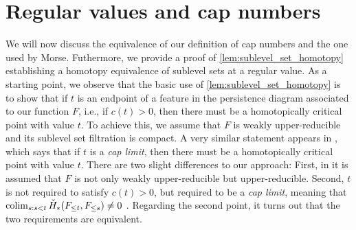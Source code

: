 
\section{Regular values and cap numbers} \label{s:caps}
We will now discuss the equivalence of our definition of cap numbers and the one used by Morse.
Futhermore, we provide a proof of \cref{lem:sublevel_set_homotopy} establishing a homotopy equivalence of sublevel sets at a regular value.
As a starting point, we observe that the basic use of \cref{lem:sublevel_set_homotopy} is to show that if $t$ is an endpoint of a feature in the persistence diagram associated to our function $F$, i.e., if $c(t) > 0$, then there must be a homotopically critical point with value $t$.
To achieve this, we assume that $F$ is weakly upper-reducible and its sublevel set filtration is compact.
A very similar statement appears in \cite[Theorem 8.1]{Morse.1938}, which says that if $t$ is a \emph{cap limit}, then there must be a homotopically critical point with value $t$.
There are two slight differences to our approach:
First, in \cite[Theorem 8.1]{Morse.1938} it is assumed that $F$ is not only weakly upper-reducible but upper-reducible.
Second, $t$ is not required to satisfy $c(t) > 0$, but required to be a \emph{cap limit}, meaning that $\operatorname*{colim}_{s: s < t} \check{H}_*(F_{\leq t}, F_{\leq s}) \neq 0$ \cite[p.~12]{Morse.1938}.
Regarding the second point, it turns out that the two requirements are equivalent.

